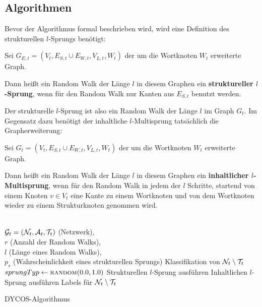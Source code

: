 \subsection{Algorithmen}
Bevor der Algorithmus formal beschrieben wird, wird eine Definition
des strukturellen $l$-Sprungs benötigt:
\begin{definition}
    Sei $G_{E,t} = (V_t, E_{S,t} \cup E_{W,t}, V_{L,t}, W_{t})$ der
    um die Wortknoten $W_{t}$ erweiterte Graph.

    Dann heißt ein Random Walk der Länge $l$ in diesem Graphen
    ein \textbf{struktureller $l$-Sprung}, wenn für den Random Walk
    nur Kanten aus $E_{S,t}$ benutzt werden.
\end{definition}

Der strukturelle $l$-Sprung ist also ein Random Walk der Länge $l$
im Graph $G_t$. Im Gegensatz dazu benötigt der inhaltliche $l$-Multisprung
tatsächlich die Grapherweiterung:

\begin{definition}
    Sei $G_t = (V_t, E_{S,t} \cup E_{W,t}, V_{L,t}, W_{t})$ der
    um die Wortknoten $W_{t}$ erweiterte Graph.

    Dann heißt ein Random Walk der Länge $l$ in diesem Graphen
    ein \textbf{inhaltlicher $l$-Multisprung}, wenn für den Random Walk
    in jedem der $l$ Schritte, startend von einem Knoten $v \in V_t$
    eine Kante zu einem Wortknoten und von dem Wortknoten wieder 
    zu einem Strukturknoten genommen wird.
\end{definition}

\begin{algorithm}[H]
    \begin{algorithmic}
        \Require \\$\mathcal{G}_t = (\mathcal{N}_t, \mathcal{A}_t, \mathcal{T}_t)$ (Netzwerk),\\
                 $r$ (Anzahl der Random Walks),\\
                 $l$ (Länge eines Random Walks),\\
                 $p_s$ (Wahrscheinlichkeit eines strukturellen Sprungs)
        \Ensure  Klassifikation von $\mathcal{N}_t \setminus \mathcal{T}_t$\\

                \State $sprungTyp \gets \Call{random}{0.0, 1.0}$
                    \State Strukturellen $l$-Sprung ausführen
                \Else
                    \State Inhaltlichen $l$-Sprung ausführen
                \EndIf
            \EndFor
        \EndFor
        \State \Return Labels für $\mathcal{N}_t \setminus \mathcal{T}_t$
    \end{algorithmic}
\caption{DYCOS-Algorithmus}
\label{alg:DYCOS}
\end{algorithm}

